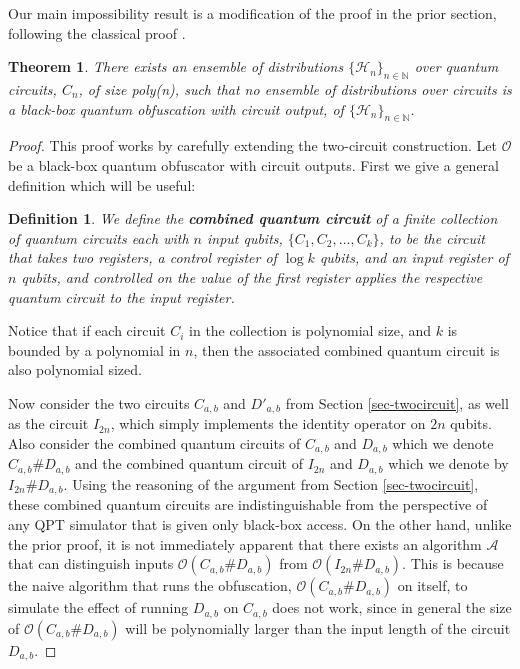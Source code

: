 \documentclass[11pt]{article}
\numberwithin{equation}{section}
\newtheorem{theorem}{Theorem}
\newtheorem{definition}{Definition}
\newcommand{\algo}{\mathcal}
\begin{document}
{Our main impossibility result is a modification of the proof in the prior section, following the classical proof \cite{BGIRSVY12}.
\begin{theorem}
There exists an ensemble of distributions $\lbrace\mathcal{H}_n\rbrace_{n\in\mathbb{N}}$ over quantum circuits, $C_n$, of size poly(n), such that no ensemble of distributions over circuits is a black-box quantum obfuscation with circuit output, of $\lbrace\mathcal{H}_n\rbrace_{n\in\mathbb{N}}$.
\end{theorem}
\begin{proof}
This proof works by carefully extending the two-circuit construction.  Let $\mathcal O$ be a black-box quantum obfuscator with circuit outputs.
First we give a general definition which will be useful:
\begin{definition}We define the {\bf combined quantum circuit} of a finite collection of quantum circuits each with $n$ input qubits, $\lbrace C_1,C_2,...,C_k \rbrace$, to be the circuit that takes two registers, a control register of $\log{k}$ qubits, and an input register of $n$ qubits, and controlled on the value of the first register applies the respective quantum circuit to the input register.   
\end{definition}

Notice that if each circuit $C_i$ in the collection is polynomial size, and $k$ is bounded by a polynomial in $n$, then the associated combined quantum circuit is also polynomial sized.   

Now consider the two circuits  $C_{a,b}$ and $D'_{a,b}$ from Section \ref{sec-twocircuit}, as well as the circuit $I_{2n}$, which simply implements the identity operator on $2n$ qubits.  Also consider the combined quantum circuits of $C_{a,b}$ and $D_{a,b}$ which we denote $C_{a,b}\#D_{a,b}$ and the combined quantum circuit of $I_{2n}$ and $D_{a,b}$ which we denote by $I_{2n}\#D_{a,b}$.  Using the reasoning of the argument from Section \ref{sec-twocircuit}, these combined quantum circuits are indistinguishable from the perspective of any QPT simulator that is given only black-box access.  On the other hand, unlike the prior proof, it is not immediately apparent that there exists an algorithm $\algo{A}$ that can distinguish inputs $\algo{O}(C_{a,b}\#D_{a,b})$ from $\algo{O}(I_{2n}\#D_{a,b})$.  This is because the naive algorithm that runs the obfuscation, $\algo{O}(C_{a,b}\#D_{a,b})$ on itself, to simulate the effect of running $D_{a,b}$ on $C_{a,b}$ does not work, since in general the size of $\algo{O}(C_{a,b}\#D_{a,b})$ will be  polynomially larger than the input length of the circuit $D_{a,b}$.


\end{proof}}
\end{document}
